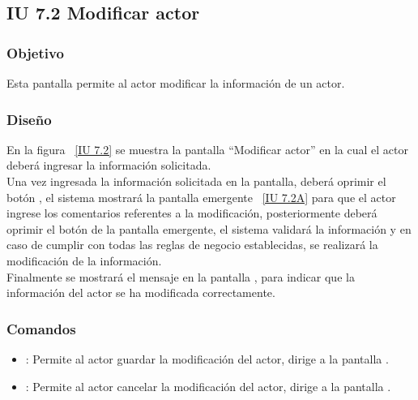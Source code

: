 \newpage 
\subsection{IU 7.2 Modificar actor}

\subsubsection{Objetivo}
	
	Esta pantalla permite al actor modificar la información de un actor.

\subsubsection{Diseño}

    En la figura ~\ref{IU 7.2} se muestra la pantalla ``Modificar actor'' en la cual el actor deberá ingresar la información solicitada. \\
    
    Una vez ingresada la información solicitada en la pantalla, deberá oprimir el botón , el sistema mostrará la pantalla emergente ~\ref{IU 7.2A} 
    para que el actor ingrese los comentarios referentes a la modificación, posteriormente deberá oprimir el botón  de la pantalla emergente, 
    el sistema validará la información y en caso de cumplir con todas las reglas de negocio establecidas, se realizará la modificación de la información.\\
    
    Finalmente se mostrará el mensaje  en la pantalla , para indicar que la información del actor se ha modificada correctamente.        



\subsubsection{Comandos}
\begin{itemize}
	\item {}: Permite al actor guardar la modificación del actor, dirige a la pantalla .
	\item {}: Permite al actor cancelar la modificación del actor, dirige a la pantalla .
\end{itemize}

